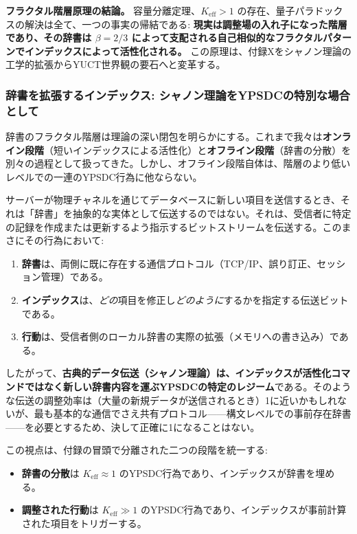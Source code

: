 \documentclass[12pt,a4paper]{article}
\theoremstyle{definition}
\theoremstyle{remark}
\begin{document}
	\noindent
	\textbf{フラクタル階層原理の結論。}
	容量分離定理、$K_{\mathrm{eff}}>1$ の存在、量子パラドックスの解決は全て、一つの事実の帰結である: \textbf{現実は調整場の入れ子になった階層であり、その辞書は $\beta=2/3$ によって支配される自己相似的なフラクタルパターンでインデックスによって活性化される。} この原理は、付録Xをシャノン理論の工学的拡張からYUCT世界観の要石へと変革する。
	
	\subsubsection{辞書を拡張するインデックス: シャノン理論をYPSDCの特別な場合として}
	
	辞書のフラクタル階層は理論の深い閉包を明らかにする。これまで我々は\textbf{オンライン段階}（短いインデックスによる活性化）と\textbf{オフライン段階}（辞書の分散）を別々の過程として扱ってきた。しかし、オフライン段階自体は、階層のより低いレベルでの一連のYPSDC行為に他ならない。
	
	サーバーが物理チャネルを通じてデータベースに新しい項目を送信するとき、それは「辞書」を抽象的な実体として伝送するのではない。それは、受信者に特定の記録を作成または更新するよう指示するビットストリームを伝送する。このまさにその行為において:
	
	\begin{enumerate}[leftmargin=*]
		\item \textbf{辞書}は、両側に既に存在する通信プロトコル（TCP/IP、誤り訂正、セッション管理）である。
		\item \textbf{インデックス}は、\emph{どの}項目を修正し\emph{どのように}するかを指定する伝送ビットである。
		\item \textbf{行動}は、受信者側のローカル辞書の実際の拡張（メモリへの書き込み）である。
	\end{enumerate}
	
	したがって、\textbf{古典的データ伝送（シャノン理論）は、インデックスが活性化コマンドではなく新しい辞書内容を運ぶYPSDCの特定のレジーム}である。そのような伝送の調整効率は（大量の新規データが送信されるとき）1に近いかもしれないが、最も基本的な通信でさえ共有プロトコル——構文レベルでの事前存在辞書——を必要とするため、決して正確に1になることはない。
	
	この視点は、付録の冒頭で分離された二つの段階を統一する:
	
	\begin{itemize}[leftmargin=*]
		\item \textbf{辞書の分散}は $K_{\mathrm{eff}} \approx 1$ のYPSDC行為であり、インデックスが辞書を埋める。
		\item \textbf{調整された行動}は $K_{\mathrm{eff}} \gg 1$ のYPSDC行為であり、インデックスが事前計算された項目をトリガーする。
	\end{itemize}
	
\end{document}
